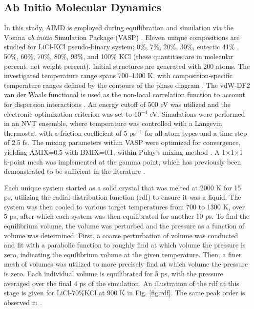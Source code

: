 \documentclass[review]{elsarticle}
\begin{document}
\subsection{Ab Initio Molecular Dynamics}
In this study, AIMD is employed during equilibration and simulation via the Vienna \textit{ab initio} Simulation Package (VASP) \cite{Kresse1993,Kresse1996,Kresse1996a}. Eleven unique compositions are studied for LiCl-KCl pseudo-binary system: 0\%, 7\%, 20\%, 30\%,  eutectic 41\% \cite{Zhou2017}, 50\%, 60\%, 70\%, 80\%, 93\%, and 100\% KCl (these quantities are in molecular percent, not weight percent). Initial structures are generated with 200 atoms. The investigated temperature range spans 700–1300 K, with composition-specific temperature ranges defined by the contours of the phase diagram \cite{Zhou2017}.  The vdW-DF2 van der Waals functional is used as the non-local correlation function to account for dispersion interactions \cite{Dion2004}. An energy cutoff of 500 eV was utilized and the electronic optimization criterion was set to 10$^{-4}$ eV. Simulations were performed in an NVT ensemble, where temperature was controlled with a Langevin thermostat with a friction coefficient of 5 ps$^{-1}$ for all atom types and a time step of 2.5 fs. The mixing parameters within VASP were optimized for convergence, yielding AMIX=0.5 with BMIX=0.1, within Pulay’s mixing method \cite{PULAY1980393}. A 1$\times$1$\times$1 k-point mesh was implemented at the gamma point, which has previously been demonstrated to be sufficient in the literature \cite{Bengston2014,Song2017}.

Each unique system started as a solid crystal that was melted at 2000 K for 15 ps, utilizing the radial distribution function (rdf) to ensure it was a liquid. The system was then cooled to various target temperatures from 700 to 1300 K, over 5 ps, after which each system was then equilibrated for another 10 ps. To find the equilibrium volume, the volume was perturbed and the pressure as a function of volume was determined. First, a coarse perturbation of volume was conducted and fit with a parabolic function to roughly find at which volume the pressure is zero, indicating the equilibrium volume at the given temperature. Then, a finer mesh of volumes was utilized to more precisely find at which volume the pressure is zero. Each individual volume is equilibrated for 5 ps, with the pressure averaged over the final 4 ps of the simulation. An illustration of the rdf at this stage is given for LiCl-70\%KCl at 900 K in Fig. \ref{fig:rdf}. The same peak order is observed in \cite{Bengston2014,WANG2019}.
\end{document}
